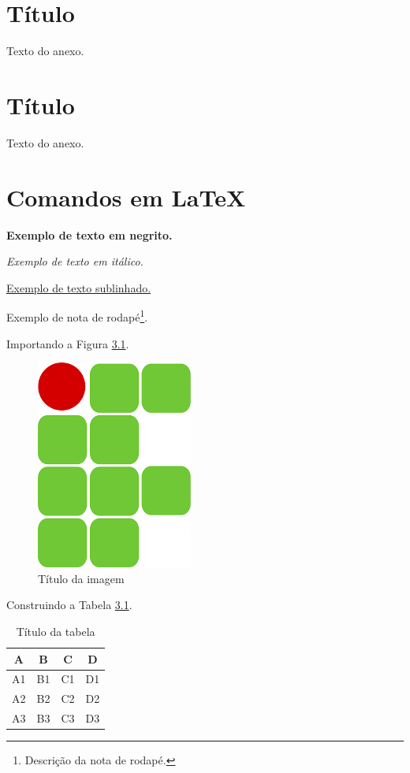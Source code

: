 \documentclass[
    12pt,               %
    openright,          %
    oneside,            %
    a4paper,            %
    english,            %
    french,             %
    spanish,            %
    brazil              %
    ]{abntex2}
\begin{document}
\begin{anexosenv}

\partanexos

\chapter{Título}

Texto do anexo.

\chapter{Título}

Texto do anexo.

\chapter{Comandos em \LaTeX}

\textbf{Exemplo de texto em negrito.}

\textit{Exemplo de texto em itálico.}

\underline{Exemplo de texto sublinhado.}

Exemplo de nota de rodapé\footnote{Descri\c cão da nota de rodapé.}.

Importando a Figura \ref{fig:imagem}.

\begin{figure}[htb]
   \centering
   \caption{\label{fig:imagem} Título da imagem}
   \includegraphics[scale=0.5]{imagens/if}
\end{figure}

Construindo a Tabela \ref{tab:tabela}.

\begin{table}[htb]
\center
\footnotesize
\caption{Título da tabela}
\label{tab:tabela}
\begin{tabular} {|c|c|c|c|} %
  \hline
   \textbf{A} & \textbf{B}  & \textbf{C}  & \textbf{D}  \\
    \hline \hline
    	A1 & B1 & C1& D1\\
   \hline
       	A2 & B2 & C2 & D2\\
   \hline
    	A3 & B3 & C3 & D3\\
   \hline
\end{tabular}
\end{table}


\end{anexosenv}
\end{document}
